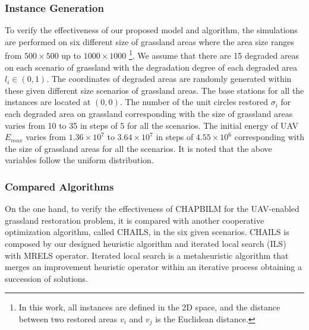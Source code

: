 \documentclass[preprint,5pt]{elsarticle}
\begin{document}
\subsubsection{Instance Generation}
To verify the effectiveness of our proposed model and algorithm, the simulations are performed on six different size of grassland areas where the area size ranges from $500 \times 500$ up to $1000 \times 1000$ \footnote{In this work, all instances are defined in the 2D space, and the distance between two restored areas $v_i$ and $v_j$ is the Euclidean distance.}.
We assume that there are 15 degraded areas on each scenario of grassland with the degradation degree of each degraded area $l_i \in (0,1)$. The coordinates of degraded areas are randomly generated within these given different size scenarios of grassland areas. The base stations for all the instances are located at $(0,0)$. The number of the unit circles restored $\sigma_i$ for each degraded area on grassland corresponding with the size of grassland areas varies from 10 to 35 in steps of 5 for all the scenarios. The initial energy of UAV $E_{max}$ varies from $1.36 \times 10^7$  to $3.64 \times 10^7$ in steps of $4.55 \times 10^6$ corresponding with the size of grassland areas for all the scenarios. It is noted that the above variables follow the uniform distribution.
\subsubsection{Compared Algorithms}
On the one hand, to verify the effectiveness of CHAPBILM for the UAV-enabled grassland restoration problem, it is compared with another cooperative optimization algorithm, called CHAILS, in the six given scenarios. CHAILS is composed by our designed heuristic algorithm and iterated local search (ILS) with MRELS operator. Iterated local search \cite{lourencco2003iterated} is a metaheuristic algorithm that merges an improvement heuristic operator within an iterative process obtaining a succession of solutions.
\end{document}
